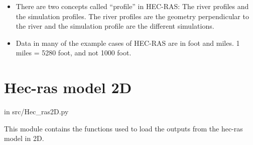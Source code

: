 \documentclass[letterpaper,10pt,english]{sphinxmanual}
\begin{document}
\begin{itemize}
\item {} 
There are two concepts called “profile” in HEC-RAS: The river profiles and the simulation profiles. The river profiles are the geometry perpendicular to the river and the simulation profile are the different simulations.

\item {} 
Data in many of the example cases of HEC-RAS are in foot and miles. 1 miles = 5280 foot, and not 1000 foot.

\end{itemize}


\section{Hec-ras model 2D}
\label{\detokenize{index:hec-ras-model-2d}}
in src/Hec\_ras2D.py

This module contains the functions used to load the outputs from the hec-ras model in 2D.
\label{\detokenize{index:module-src.hec_ras2D}}
\end{document}
